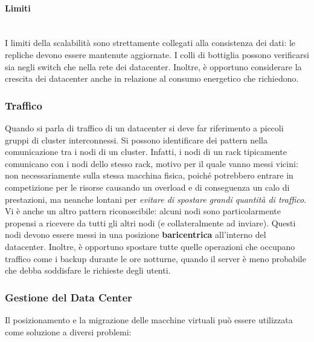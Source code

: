 \documentclass{article}
\begin{document}
		\hypertarget{limiti}{%
		\paragraph{Limiti}\label{limiti}}\mbox{}\\
		I limiti della scalabilità sono strettamente collegati alla
		consistenza dei dati: le repliche devono essere
		mantenute aggiornate. I colli di bottiglia
		possono verificarsi sia negli switch che nella
		rete dei datacenter. Inoltre, è opportuno considerare la
		crescita dei datacenter anche in relazione al
		consumo energetico che richiedono.
		
		\hypertarget{traffico}{%
		\subsubsection{Traffico}\label{traffico}}
		
		Quando si parla di traffico di un datacenter si deve far riferimento a
		piccoli gruppi di cluster interconnessi. Si possono identificare dei pattern nella comunicazione tra i nodi di un cluster. Infatti, i nodi di un rack tipicamente comunicano con i nodi dello stesso rack, motivo per il quale vanno messi vicini:
		non necessariamente sulla stessa macchina fisica, poiché
		potrebbero entrare in competizione per le risorse causando un
		overload e di conseguenza un calo di prestazioni, ma
		neanche lontani per \emph{evitare di spostare grandi
		quantità di traffico}. Vi è anche un altro pattern riconoscibile: alcuni nodi sono particolarmente propensi a ricevere da tutti gli altri nodi (e collateralmente ad inviare). Questi nodi devono essere messi in una posizione \textbf{baricentrica} all'interno del datacenter. Inoltre, è opportuno spostare tutte quelle
		operazioni che occupano traffico come i backup durante le
		ore notturne, quando il server è meno probabile che debba
		soddisfare le richieste degli utenti.
		
		\subsubsection{Gestione del Data Center}\label{gestione-del-data-center}
		
		Il posizionamento e la migrazione delle macchine
		virtuali può essere utilizzata come soluzione a diversi problemi:
		
\end{document}
